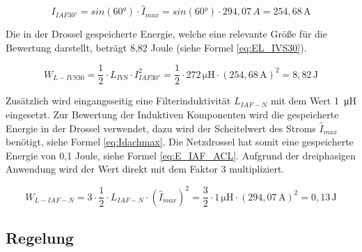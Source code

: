 		
		
		\begin{equation}
			\label{eq:IAF_I30}
			I_{IAF30°}= sin(60°)\cdot \hat{I}_{max}=sin(60°)\cdot 294,07 \,A =254,68\, \si{\A}
		\end{equation}
		
		
		Die in der Drossel gespeicherte Energie, welche eine relevante Größe für die Bewertung darstellt, beträgt 8,82 Joule (siehe Formel \ref{eq:EL_IVS30}).
		
		\begin{equation}
			\label{eq:EL_IVS30}
			W_{L-IVS30}=\dfrac{1}{2} \cdot L_{IVS} \cdot I_{IAF30°}^{2} = \dfrac{1}{2}\cdot 272\, \si{\micro \henry} \cdot (254,68\, \si{\A})^{2} =  8,82 \, \si{\joule}
		\end{equation}
		
		
		
		Zusätzlich wird eingangsseitig eine Filterinduktivität $L_{IAF-N}$ mit dem Wert 1~\si{\micro \henry} eingesetzt. Zur Bewertung der Induktiven Komponenten wird die gespeicherte Energie in der Drossel verwendet, dazu wird der Scheitelwert des Stroms $\hat{I}_{max}$ benötigt, siehe Formel \ref{eq:Idachmax}. Die Netzdrossel hat somit eine gespeicherte Energie von 0,1 Joule, siehe Formel \ref{eq:E_IAF_ACL}. Aufgrund der dreiphasigen Anwendung wird der Wert direkt mit dem Faktor 3 multipliziert.
			
			\begin{equation}
			\label{eq:E_IAF_ACL}
			W_{L-IAF-N}= 3\cdot \dfrac{1}{2} \cdot L_{IAF-N} \cdot (\hat{I}_{max})^2=\dfrac{3}{2} \cdot 1\, \si{\micro \henry} \cdot (294,07 \, \si{\ampere})^{2} = 0,13 \, \si{\joule}
		\end{equation}
	
	\subsection{Regelung}
		
